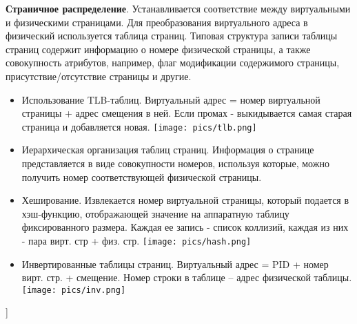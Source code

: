\textbf{Страничное распределение}. Устанавливается соответствие между виртуальными и физическими страницами. Для преобразования виртуального адреса в физический используется таблица страниц. Типовая структура записи таблицы страниц содержит информацию о номере физической страницы, а также совокупность атрибутов, например, флаг модификации содержимого страницы, присутствие/отсутствие страницы и другие.
\begin{itemize}
    \item Использование TLB-таблиц. Виртуальный адрес = номер виртуальной страницы + адрес смещения в ней. Если промах - выкидывается самая старая страница и добавляется новая.
    \texttt{[image: pics/tlb.png]}
    \item Иерархическая организация таблиц страниц. Информация о странице представляется в виде совокупности номеров, используя которые, можно получить номер соответствующей физической страницы.
    \item Хеширование. Извлекается номер виртуальной страницы, который подается в хэш-функцию, отображающей значение на аппаратную таблицу фиксированного размера. Каждая ее запись - список коллизий, каждая из них - пара вирт. стр + физ. стр.
    \texttt{[image: pics/hash.png]}
    \item Инвертированные таблицы страниц. Виртуальный адрес = PID + номер вирт. стр. + смещение. Номер строки в таблице -- адрес физической таблицы.
    \texttt{[image: pics/inv.png]}
\end{itemize}


\bigbreak
[\cite[page 69-96]{replace_me}]

